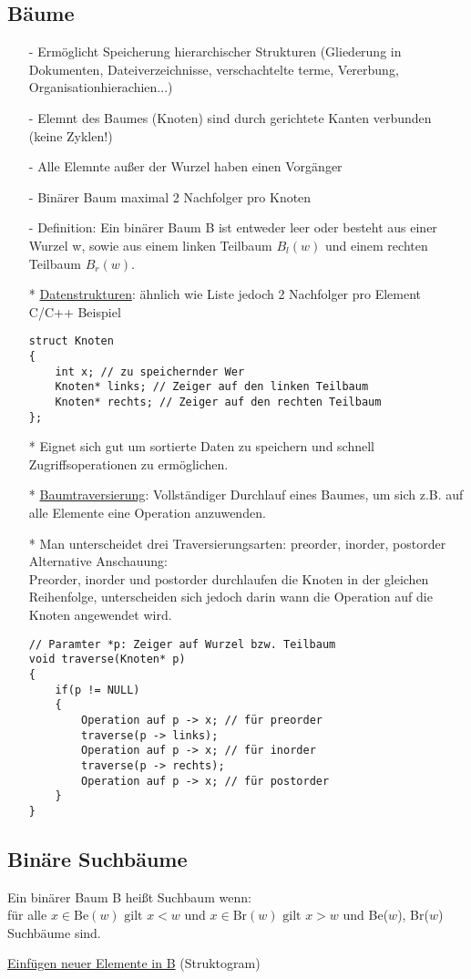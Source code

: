 \subsection{Bäume}
\begin{itemize}
    \item[-] Ermöglicht Speicherung hierarchischer Strukturen (Gliederung in Dokumenten, Dateiverzeichnisse, verschachtelte terme, Vererbung, Organisationhierachien...)
    \item[-] Elemnt des Baumes (Knoten) sind durch gerichtete Kanten verbunden (keine Zyklen!)
    \item[-] Alle Elemnte außer der Wurzel haben einen Vorgänger
    \item[-] Binärer Baum maximal 2 Nachfolger pro Knoten
    \item[-] Definition: Ein binärer Baum B ist entweder leer oder besteht aus einer Wurzel w, sowie aus einem linken Teilbaum $B_l(w)$ und einem rechten Teilbaum $B_r(w)$.
    \item[*] \underline{Datenstrukturen}: ähnlich wie Liste jedoch 2 Nachfolger pro Element \\
C/C++ Beispiel
\begin{lstlisting}
struct Knoten
{
    int x; // zu speichernder Wer
    Knoten* links; // Zeiger auf den linken Teilbaum
    Knoten* rechts; // Zeiger auf den rechten Teilbaum
};
\end{lstlisting}
    \item[*] Eignet sich gut um sortierte Daten zu speichern und schnell Zugriffsoperationen zu ermöglichen.
    \item[*] \underline{Baumtraversierung}: Vollständiger Durchlauf eines Baumes, um sich z.B. auf alle Elemente eine Operation anzuwenden.
    \item[*] Man unterscheidet drei Traversierungsarten: preorder, inorder, postorder
    Alternative Anschauung:\\
    Preorder, inorder und postorder durchlaufen die Knoten in der gleichen Reihenfolge, unterscheiden sich jedoch darin wann die Operation auf die Knoten angewendet wird.\\
    \begin{lstlisting}
// Paramter *p: Zeiger auf Wurzel bzw. Teilbaum
void traverse(Knoten* p)
{
    if(p != NULL)
    {
        Operation auf p -> x; // für preorder
        traverse(p -> links);
        Operation auf p -> x; // für inorder
        traverse(p -> rechts);
        Operation auf p -> x; // für postorder
    }
}
\end{lstlisting}
\end{itemize}
\subsection{Binäre Suchbäume}
Ein binärer Baum B heißt Suchbaum wenn: \\
für alle $x \in \mbox{Be}(w) \mbox{ gilt } x < w$ und $x \in \mbox{Br}(w) \mbox{ gilt } x > w$ und Be($w$), Br($w$) Suchbäume sind. 

\underline{Einfügen neuer Elemente in B} (Struktogram)
